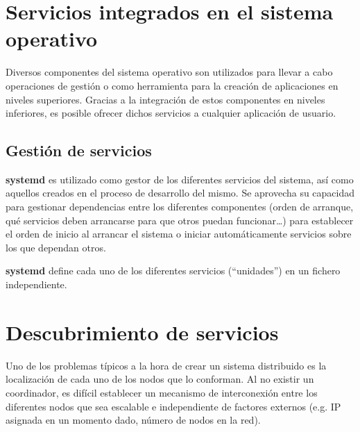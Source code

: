 \section{Servicios integrados en el sistema operativo}

Diversos componentes del sistema operativo son utilizados para llevar a cabo operaciones de gestión o como herramienta para la creación de aplicaciones en niveles superiores. Gracias a la integración de estos componentes en niveles inferiores, es posible ofrecer dichos servicios a cualquier aplicación de usuario. 


\subsection{Gestión de servicios}

\textbf{systemd} es utilizado como gestor de los diferentes servicios del sistema, así como aquellos creados en el proceso de desarrollo del mismo. Se aprovecha su capacidad para gestionar dependencias entre los diferentes componentes (orden de arranque, qué servicios deben arrancarse para que otros puedan funcionar\dots) para establecer el orden de inicio al arrancar el sistema o iniciar automáticamente servicios sobre los que dependan otros.

\textbf{systemd} define cada uno de los diferentes servicios (``unidades'') en un fichero independiente.

\section{Descubrimiento de servicios}

Uno de los problemas típicos a la hora de crear un sistema distribuido es la localización de cada uno de los nodos que lo conforman. Al no existir un coordinador, es difícil establecer un mecanismo de interconexión entre los diferentes nodos que sea escalable e independiente de factores externos (e.g. IP asignada en un momento dado, número de nodos en la red).


